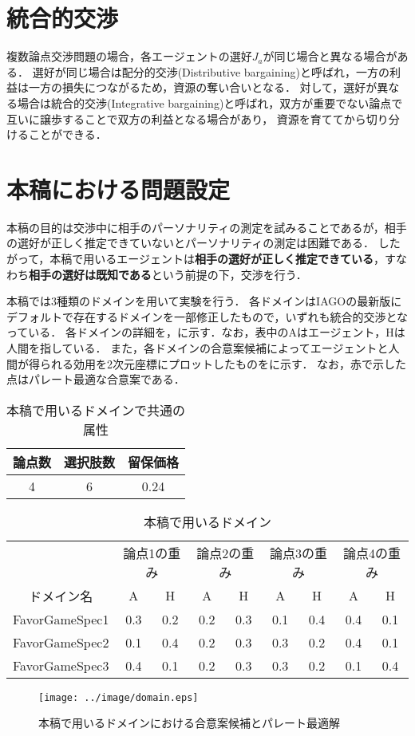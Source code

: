 \section{統合的交渉}
複数論点交渉問題の場合，各エージェントの選好$J_a$が同じ場合と異なる場合がある．
選好が同じ場合は配分的交渉(Distributive bargaining)と呼ばれ，一方の利益は一方の損失につながるため，資源の奪い合いとなる．
対して，選好が異なる場合は統合的交渉(Integrative bargaining)と呼ばれ，双方が重要でない論点で互いに譲歩することで双方の利益となる場合があり，
資源を育ててから切り分けることができる．

\section{本稿における問題設定}
本稿の目的は交渉中に相手のパーソナリティの測定を試みることであるが，相手の選好が正しく推定できていないとパーソナリティの測定は困難である．
したがって，本稿で用いるエージェントは{\bf 相手の選好が正しく推定できている}，すなわち{\bf 相手の選好は既知である}という前提の下，交渉を行う．

本稿では3種類のドメインを用いて実験を行う．
各ドメインはIAGOの最新版にデフォルトで存在するドメインを一部修正したもので，いずれも統合的交渉となっている．
各ドメインの詳細を，に示す．なお，表中のAはエージェント，Hは人間を指している．
また，各ドメインの合意案候補によってエージェントと人間が得られる効用を2次元座標にプロットしたものをに示す．
なお，赤で示した点はパレート最適な合意案である．

\begin{table}[htb]
  \centering
  \caption{本稿で用いるドメインで共通の属性}
  \begin{tabular}{ccc} \toprule
      論点数 & 選択肢数 & 留保価格 \\ \midrule
      4 & 6 & 0.24 \\ \bottomrule
  \end{tabular}
  \label{tab:common-domain}
\end{table}

\begin{table}[htb]
  \centering
  \caption{本稿で用いるドメイン}
  \begin{tabular}{ccccccccc} \toprule
      & \multicolumn{2}{c}{論点1の重み} & \multicolumn{2}{c}{論点2の重み} & \multicolumn{2}{c}{論点3の重み} & \multicolumn{2}{c}{論点4の重み} \\
      ドメイン名  & A & H & A & H & A & H & A & H \\ \midrule
      FavorGameSpec1 & 0.3 & 0.2 & 0.2 & 0.3 & 0.1 & 0.4 & 0.4 & 0.1 \\
      FavorGameSpec2 & 0.1 & 0.4 & 0.2 & 0.3 & 0.3 & 0.2 & 0.4 & 0.1 \\
      FavorGameSpec3 & 0.4 & 0.1 & 0.2 & 0.3 & 0.3 & 0.2 & 0.1 & 0.4 \\ \bottomrule
  \end{tabular}
  \label{tab:domain}
\end{table}

\begin{figure}[htb]
  \centering
  \texttt{[image: ../image/domain.eps]}
  \caption{本稿で用いるドメインにおける合意案候補とパレート最適解}
  \label{fig:domain}
\end{figure}

